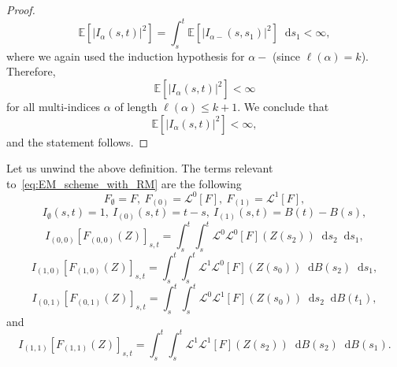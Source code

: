 \documentclass[11pt]{amsart}
\newcommand{\E}{{\mathbb E}}
\newcommand*\diff{\mathop{}\!\mathrm{d}}
\newcommand{\Lo}{\mathcal{L}^{0}}
\newcommand{\Li}{\mathcal{L}^{1}}
\begin{document}
{\begin{proof}
\begin{equation*}
\E \left[ \left| I_{\alpha}(s,t) \right|^{2} \right] = \int_{s}^{t} \E \left[ \left| I_{\alpha-}(s,s_{1}) \right|^{2} \right] \diff s_{1} < \infty,
\end{equation*}
where we again used the induction hypothesis for $\alpha-$ (since $\ell(\alpha)=k$). Therefore,
\begin{equation*}
\E \left[ \left| I_{\alpha}(s,t) \right|^{2} \right] < \infty
\end{equation*}
for all multi-indices $\alpha$ of length $\ell(\alpha) \leq k +1$. We conclude that
\begin{equation*}
\E \left[ \left| I_{\alpha}(s,t) \right|^{2} \right] < \infty,
\end{equation*}
and the statement follows.
\end{proof}

Let us unwind the above definition. The terms relevant to~\eqref{eq:EM_scheme_with_RM} are the following
\begin{equation*}
F_{\emptyset} = F,\ F_{(0)} = \Lo[F],\ F_{(1)} = \Li[F],
\end{equation*}
\begin{equation*}
I_{\emptyset}(s,t) = 1,\ I_{(0)}(s,t) = t - s,\ I_{(1)}(s,t) = B(t) - B(s),
\end{equation*}
\begin{equation*}
I_{(0,0)}[F_{(0,0)}(Z)]_{s,t} = \int_{s}^{t} \int_{s}^{t} \Lo \Lo [F](Z(s_{2})) \diff s_{2} \diff s_{1},
\end{equation*}
\begin{equation*}
I_{(1,0)}[F_{(1,0)}(Z)]_{s,t} = \int_{s}^{t} \int_{s}^{t} \Li \Lo [F](Z(s_{0})) \diff B(s_{2}) \diff s_{1},
\end{equation*}
\begin{equation*}
I_{(0,1)}[F_{(0,1)}(Z)]_{s,t} = \int_{s}^{t} \int_{s}^{t} \Lo \Li [F](Z(s_{0})) \diff s_{2} \diff B(t_{1}),
\end{equation*}
and
\begin{equation*}
I_{(1,1)}[F_{(1,1)}(Z)]_{s,t} = \int_{s}^{t} \int_{s}^{t} \Li \Li [F](Z(s_{2})) \diff B(s_{2}) \diff B(s_{1}).
\end{equation*}

}
\end{document}
